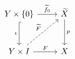 \documentclass{article}
\begin{document}
    \begin{equation*}
        \begin{tikzcd}[row sep=0.4in]
            Y\times\l\{0\r\} \ar[r, "\widetilde{f}_0"] \ar[d, "\iota"', hookrightarrow] & \widetilde{X} \ar[d, "p"] \\
            Y\times I \ar[r, "F"] \ar[ur, "\widetilde{F}", dashed] & X
        \end{tikzcd}
    \end{equation*}
\end{document}
